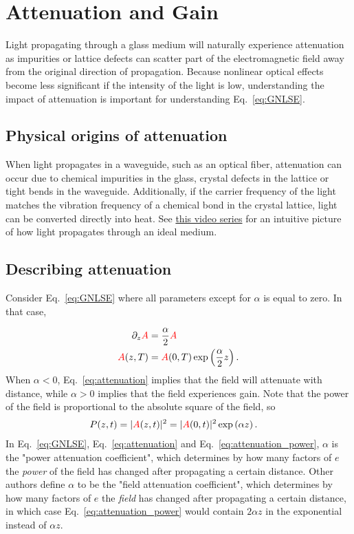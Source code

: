 \chapter{Attenuation and Gain}
\label{ch:attenuation}


Light propagating through a glass medium will naturally experience attenuation as impurities or lattice defects can scatter part of the electromagnetic field away from the original direction of propagation. Because nonlinear optical effects become less significant if the intensity of the light is low, understanding the impact of attenuation is important for understanding Eq.~\ref{eq:GNLSE}.


\section{Physical origins of attenuation}
When light propagates in a waveguide, such as an optical fiber, attenuation can occur due to chemical impurities in the glass, crystal defects in the lattice or tight bends in the waveguide. Additionally, if the carrier frequency of the light matches the vibration frequency of a chemical bond in the crystal lattice, light can be converted directly into heat. See \href{https://www.youtube.com/watch?v=QCX62YJCmGk&list=PLZHQObOWTQDMKqfyUvG2kTlYt-QQ2x-ui}{this video series} for an intuitive picture of how light propagates through an ideal medium. 


\section{Describing attenuation}

Consider Eq.~\ref{eq:GNLSE} where all parameters except for $\alpha$ is equal to zero. In that case,

\begin{align}
    \label{eq:attenuation}
    \partial_z\textcolor{red}{A} &= \frac{\alpha}{2} \textcolor{red}{A} \\ \nonumber
    \textcolor{red}{A}(z,T)&=\textcolor{red}{A}(0,T)\exp\left( \frac{\alpha}{2}z \right). 
\end{align}
When $\alpha<0$, Eq.~\ref{eq:attenuation} implies that the field will attenuate with distance, while $\alpha>0$ implies that the field experiences gain. Note that the power of the field is proportional to the absolute square of the field, so
\begin{align}
    \label{eq:attenuation_power}
    P(z,t)=|\textcolor{red}{A}(z,t)|^2&=|\textcolor{red}{A}(0,t)|^2 \exp\left( \alpha z \right). 
\end{align}
In Eq.~\ref{eq:GNLSE}, Eq.~\ref{eq:attenuation} and Eq.~\ref{eq:attenuation_power}, $\alpha$ is the "power attenuation coefficient", which determines by how many factors of $e$ the \emph{power} of the field has changed after propagating a certain distance. Other authors define $\alpha$ to be the "field attenuation coefficient", which determines by how many factors of $e$ the \emph{field} has changed after propagating a certain distance, in which case Eq.~\ref{eq:attenuation_power} would contain $2\alpha z$ in the exponential instead of $\alpha z$. 

